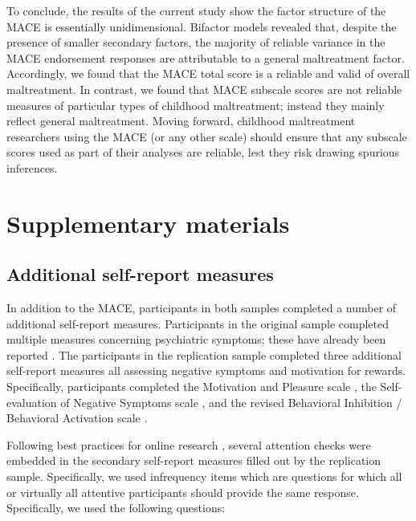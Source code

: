 \documentclass[letterpaper,man,natbib,noextraspace,floatsintext,longtable]{apa6}
\begin{document}
To conclude, the results of the current study show the factor structure of the MACE is essentially unidimensional. Bifactor models revealed that, despite the presence of smaller secondary factors, the majority of reliable variance in the MACE endorsement responses are attributable to a general maltreatment factor. Accordingly, we found that the MACE total score is a reliable and valid of overall maltreatment. In contrast, we found that MACE subscale scores are not reliable measures of particular types of childhood maltreatment; instead they mainly reflect general maltreatment. Moving forward, childhood maltreatment researchers using the MACE (or any other scale) should ensure that any subscale scores used as part of their analyses are reliable, lest they risk drawing spurious inferences. 



\pagebreak
\section{Supplementary materials}

\setcounter{figure}{0}
\setcounter{table}{0}
\renewcommand{\thetable}{S\arabic{table}}
\renewcommand{\thefigure}{S\arabic{figure}}

\subsection*{Additional self-report measures}

In addition to the MACE, participants in both samples completed a number of additional self-report measures. Participants in the original sample completed multiple measures concerning psychiatric symptoms; these have already been reported . The participants in the replication sample completed three additional self-report measures all assessing negative symptoms and motivation for rewards. Specifically, participants completed the Motivation and Pleasure scale , the Self-evaluation of Negative Symptoms scale , and the revised Behavioral Inhibition / Behavioral Activation scale .

Following best practices for online research , several attention checks were embedded in the secondary self-report measures filled out by the replication sample. Specifically, we used infrequency items which are questions for which all  or virtually all attentive participants should provide the same response. Specifically, we used the following questions:
\end{document}
